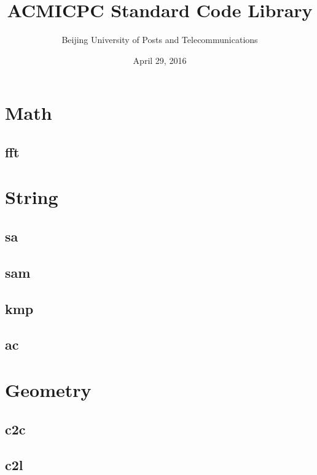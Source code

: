 \documentclass[10pt,a4paper]{article}
\begin{document}
\begin{spacing}{0.5}
	\title{ACMICPC Standard Code Library}
	\author{Beijing University of Posts and Telecommunications}
	\date{April 29, 2016}
	\maketitle
	\newpage

	\tableofcontents
	\newpage

	\section{Math}
		\subsection{fft}
			
	\section{String}
		\subsection{sa}
			
		\subsection{sam}
			
		\subsection{kmp}
			
		\subsection{ac}
			
	\section{Geometry}
		\subsection{c2c}
			
		\subsection{c2l}
			

\end{spacing}
\end{document}
